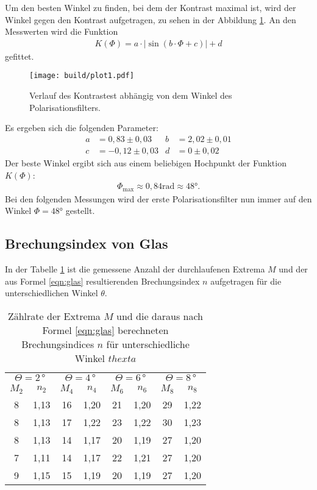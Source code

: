 Um den besten Winkel zu finden, bei dem der Kontrast maximal ist, wird
der Winkel gegen den Kontrast aufgetragen, zu sehen in der Abbildung \ref{fig:kontrast}.
An den Messwerten wird die Funktion
\begin{align}
  K\left(\Phi\right) = a \cdot \left| \sin\left(b\cdot\Phi+c \right)\right| + d
\end{align}
gefittet.

\begin{figure}
    \centering
    \texttt{[image: build/plot1.pdf]}
    \caption{Verlauf des Kontrastest abhängig von dem Winkel des Polarisationsfilters.}
    \label{fig:kontrast}
\end{figure}

Es ergeben sich die folgenden Parameter:
\begin{align*}
  a&=0,83\pm0,03
  &b&=2,02\pm0,01\\
  c&=-0,12\pm0,03
  &d&=0\pm0,02
\end{align*}
Der beste Winkel ergibt sich aus einem beliebigen
Hochpunkt der Funktion $K(\Phi)$:
\begin{align*}
 \Phi_\mathrm{max}\approx0,84\si{\radian}\approx48\si{\degree}.
\end{align*}
Bei den folgenden Messungen wird der erste Polarisationsfilter
nun immer auf den Winkel $\Phi=48\si{\degree}$ gestellt.


\subsection{Brechungsindex von Glas}
In der Tabelle \ref{tab:glas} ist die gemessene Anzahl der durchlaufenen Extrema $M$
und der aus Formel \eqref{eqn:glas} resultierenden Brechungsindex $n$ aufgetragen
für die unterschiedlichen Winkel $\theta$.

\begin{table}
  \centering
  \caption{Zählrate der Extrema $M$ und die daraus nach Formel \eqref{eqn:glas} berechneten Brechungsindices $n$ für unterschiedliche Winkel $thexta$}
  \label{tab:glas}
  \begin{tabular}{c c | c c | c c | c c}
    \toprule
\multicolumn{2}{c}{$\Theta=2\,\si{\degree}$}  &  \multicolumn{2}{c}{$\Theta=4\,\si{\degree}$} & \multicolumn{2}{c}{$\Theta=6\,\si{\degree}$} & \multicolumn{2}{c}{$\Theta=8\,\si{\degree}$}\\
      $M_2$ &  $n_2$ &  $M_4$ & $n_4$ & $M_6$ &  $n_6$ & $M_8$ & $n_8$ \\
  \midrule
       8 &  1,13 &  16 &  1,20 & 21 & 1,20 & 29 & 1,22\\
       8 &  1,13 &  17 &  1,22 & 23 & 1,22 & 30 & 1,23\\
       8 &  1,13 &  14 &  1,17 & 20 & 1,19 & 27 & 1,20\\
       7 &  1,11 &  14 &  1,17 & 22 & 1,21 & 27 & 1,20\\
       9 &  1,15 &  15 &  1,19 & 20 & 1,19 & 27 & 1,20\\
  \bottomrule
  \end{tabular}
\end{table}


